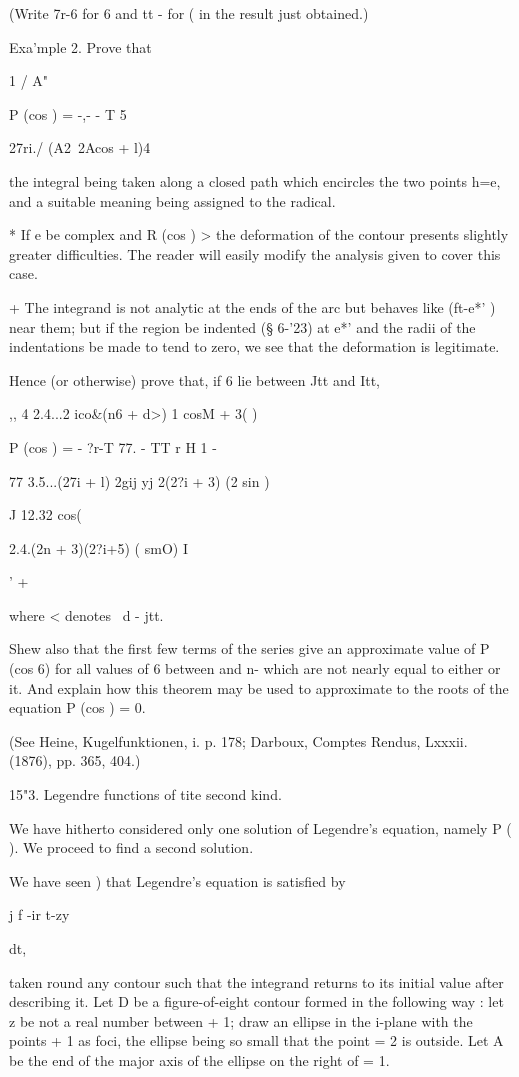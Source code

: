 {{(Write 7r-6 for 6 and tt - for ( in the result just obtained.)

Exa'mple 2. Prove that

1 / A"

P (cos ) = -,-  - T 5

27ri./ (A2\ 2Acos + l)4

the integral being taken along a closed path which encircles the two
points h=e, and a suitable meaning being assigned to the radical.

* If e be complex and R (cos ) > the deformation of the contour
presents slightly greater difficulties. The reader will easily modify
the analysis given to cover this case.

+ The integrand is not analytic at the ends of the arc but behaves
like (ft-e*' )~ near them; but if the region be indented (§ 6-'23) at
e*' and the radii of the indentations be made to tend to zero, we see
that the deformation is legitimate.

%
%

Hence (or otherwise) prove that, if 6 lie between Jtt and Itt,

,, 4 2.4...2 ico\&(n6 + d>) 1 cosM + 3( )\

P (cos ) = - ?r-T 77. - TT r H 1 -

77 3.5...(27i + l) 2gij yj 2(2?i + 3) (2 sin )

J 12.32 cos(%

2.4.(2n + 3)(2?i+5) ( smO) I

' +

where < denotes \ d - jtt.

Shew also that the first few terms of the series give an approximate
value of P (cos 6) for all values of 6 between and n- which are not
nearly equal to either or it. And explain how this theorem may be used
to approximate to the roots of the equation P (cos ) = 0.

(See Heine, Kugelfunktionen, i. p. 178; Darboux, Comptes Rendus,
Lxxxii. (1876), pp. 365, 404.)

 15"3. Legendre functions of tite second kind.

We have hitherto considered only one solution of Legendre's equation,
namely P ( ). We proceed to find a second solution.

We have seen ) that Legendre's equation is satisfied by

j f -ir t-zy

dt,

taken round any contour such that the integrand returns to its initial
value after describing it. Let D be a figure-of-eight contour formed
in the following way : let z be not a real number between + 1; draw
an ellipse in the i-plane with the points + 1 as foci, the ellipse
being so small that the point = 2 is outside. Let A be the end of the
major axis of the ellipse on the right of = 1.

}}
